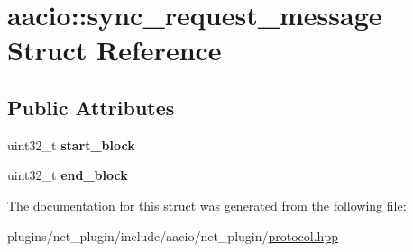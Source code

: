 \hypertarget{structaacio_1_1sync__request__message}{}\section{aacio\+:\+:sync\+\_\+request\+\_\+message Struct Reference}
\label{structaacio_1_1sync__request__message}
\subsection*{Public Attributes}
\begin{DoxyCompactItemize}
\item 
\mbox{\label{structaacio_1_1sync__request__message_a001a795b6e43d16c01d27547f1589805}} 
uint32\+\_\+t {\bfseries start\+\_\+block}
\item 
\mbox{\label{structaacio_1_1sync__request__message_a010b0e969b46285346c460c8b6ccfaa2}} 
uint32\+\_\+t {\bfseries end\+\_\+block}
\end{DoxyCompactItemize}


The documentation for this struct was generated from the following file\+:\begin{DoxyCompactItemize}
\item 
plugins/net\+\_\+plugin/include/aacio/net\+\_\+plugin/\mbox{\hyperlink{plugins_2net__plugin_2include_2aacio_2net__plugin_2protocol_8hpp}{protocol.\+hpp}}\end{DoxyCompactItemize}
